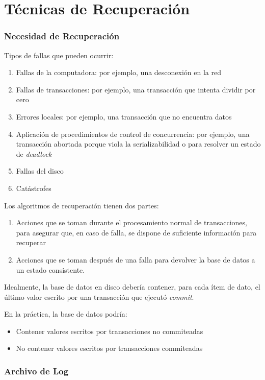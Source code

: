 \documentclass[a4paper, twoside]{article}
\begin{document}
\pagebreak{}


\part{Técnicas de Recuperación}


\section{Necesidad de Recuperación}

Tipos de fallas que pueden ocurrir:
\begin{enumerate}
\item Fallas de la computadora: por ejemplo, una desconexión en la red
\item Fallas de transacciones: por ejemplo, una transacción que intenta
dividir por cero
\item Errores locales: por ejemplo, una transacción que no encuentra datos
\item Aplicación de procedimientos de control de concurrencia: por ejemplo,
una transacción abortada porque viola la serializabilidad o para resolver
un estado de \emph{deadlock}
\item Fallas del disco
\item Catástrofes
\end{enumerate}
Los algoritmos de recuperación tienen dos partes:
\begin{enumerate}
\item Acciones que se toman durante el procesamiento normal de transacciones,
para asegurar que, en caso de falla, se dispone de suficiente información
para recuperar
\item Acciones que se toman después de una falla para devolver la base de
datos a un estado consistente.
\end{enumerate}
Idealmente, la base de datos en disco debería contener, para cada
ítem de dato, el último valor escrito por una transacción que ejecutó
\emph{commit}.

En la práctica, la base de datos podría:
\begin{itemize}
\item Contener valores escritos por transacciones no commiteadas
\item No contener valores escritos por transacciones commiteadas
\end{itemize}

\section{Archivo de Log}
\end{document}
